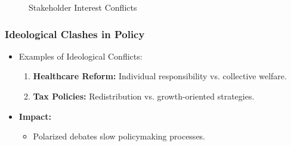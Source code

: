 \documentclass[10pt]{beamer}
\begin{document}
\begin{frame}
\begin{frame}
                    \vspace{0.5cm}
                    
                    \begin{figure}
                        \centering
                        \caption{\scriptsize Stakeholder Interest Conflicts}
                    \end{figure}
                \end{frame}
                
                \begin{frame}
                    \frametitle{Ideological Clashes in Policy}
                    \begin{itemize}
                        \item Examples of Ideological Conflicts:
                            \begin{enumerate}
                                \item \textbf{Healthcare Reform:} Individual responsibility vs. collective welfare.
                                \item \textbf{Tax Policies:} Redistribution vs. growth-oriented strategies.
                            \end{enumerate}
                        \item \textbf{Impact:}
                            \begin{itemize}
                                \item Polarized debates slow policymaking processes.
                            \end{itemize}
                    \end{itemize}
                    

\end{frame}
\end{frame}
\end{document}
